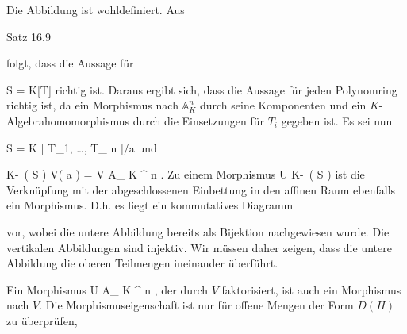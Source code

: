 {





Die Abbildung ist wohldefiniert. Aus

Satz 16.9

folgt, dass die Aussage für

\mavergleichskette
{\vergleichskette
{ S
}
{ = }{ K[T]
}
{  }{
}
{    }{
}
{   }{
}
}
{}{}{}
richtig ist. Daraus ergibt sich, dass die Aussage für jeden Polynomring
 richtig ist, da ein Morphismus nach ${ {\mathbb A}_{  K }^{  n   } }$ durch seine Komponenten und ein $K$-Algebrahomomorphismus durch die Einsetzungen für $T_i$ gegeben ist. Es sei nun

\mavergleichskette
{\vergleichskette
{ S
}
{ = }{ K [ T_1, \ldots ,  T_{ n }]/{\mathfrak a}
}
{  }{
}
{    }{
}
{   }{
}
}
{}{}{}
und

\mavergleichskettedisp
{\vergleichskette
{ K\!-\!\, \left(  S  \right)
}
{ \cong} { V( {\mathfrak a} )
}
{ =} { V
}
{ \subseteq} { { {\mathbb A}_{  K }^{  n   } }
}
{ } {
}
}
{}{}{.}
Zu einem Morphismus
\maabb {} { U } { K\!-\!\, \left(  S  \right)
} {}
ist die Verknüpfung mit der abgeschlossenen Einbettung in den affinen Raum ebenfalls ein Morphismus. D.h. es liegt ein kommutatives Diagramm

 {  }




vor, wobei die untere Abbildung bereits als Bijektion nachgewiesen wurde. Die vertikalen Abbildungen sind injektiv. Wir müssen daher zeigen, dass die untere Abbildung die oberen Teilmengen ineinander überführt.

Ein Morphismus
\maabb {} { U } { { {\mathbb A}_{  K }^{  n   } }
} {,}
der
 {} {}
durch $V$ faktorisiert, ist auch ein Morphismus nach $V$. Die Morphismuseigenschaft ist nur für offene Mengen der Form $D(H)$ zu überprüfen,

}
